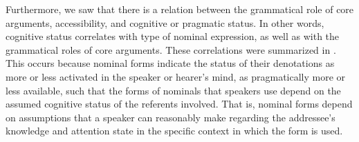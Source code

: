 Furthermore, we saw that there is a relation between the grammatical role of core arguments, accessibility, and cognitive or pragmatic status. In other words, cognitive status correlates with type of nominal expression, as well as with the grammatical roles of core arguments. These correlations were summarized in . This occurs because nominal forms indicate the status of their denotations as more or less activated in the speaker or hearer's mind, as pragmatically more or less available, such that the forms of nominals that speakers use depend on the assumed cognitive status of the referents involved. That is, nominal forms depend on assumptions that a speaker can reasonably make regarding the addressee's knowledge and attention state in the specific context in which the form is used. 


